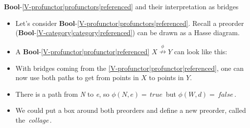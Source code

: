 
\textbf{Bool}-\ref{V-profunctor|profunctors|referenced} and their interpretation as bridges

  \begin{itemize}
    \item Let's consider \textbf{Bool}-\ref{V-profunctor|profunctors|referenced}. Recall a preorder (\textbf{Bool}-\ref{V-category|category|referenced}) can be drawn as a Hasse diagram.
    \item A \textbf{Bool}-\ref{V-profunctor|profunctor|referenced} $X \overset{\phi}{\nrightarrow} Y$ can look like this:



    \item With bridges coming from the \ref{V-profunctor|profunctor|referenced}, one can now use both paths to get from points in $X$ to points in $Y$.
    \item There is a path from \emph{N} to \emph{e}, so $\phi(N,e)=$\,$true$\, but $\phi(W,d)=$\,$false$\,.
    \item We could put a box around both preorders and define a new preorder, called the \,\emph{collage}\,.

  \end{itemize}